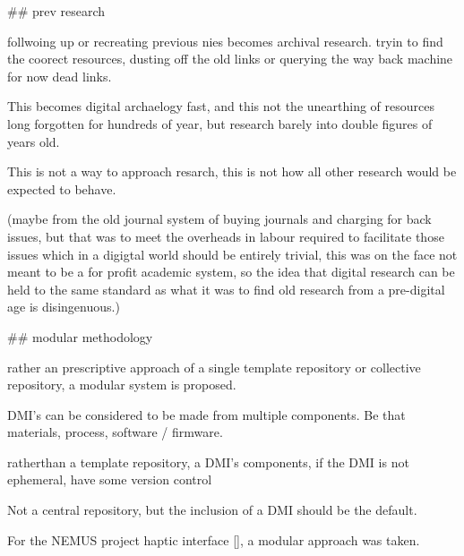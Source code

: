 




## prev research

follwoing up or recreating previous nies becomes archival research. tryin to find the coorect resources, dusting off the old links or querying the way back machine for now dead links.

This becomes digital archaelogy fast, and this not the unearthing of resources long forgotten for hundreds of year, but research barely into double figures of years old.

This is not a way to approach resarch, this is not how all other research would be expected to behave.

(maybe from the old journal system of buying journals and charging for back issues, but that was to meet the overheads in labour required to facilitate those issues which in a digigtal world should be entirely trivial, this was on the face not meant to be a for profit academic system, so the idea that digital research can be held to the same standard as what it was to find old research from a pre-digital age is disingenuous.)

## modular methodology

rather an prescriptive approach of a single template repository or collective repository, a modular system is proposed.

DMI's can be considered to be made from multiple components. Be that materials, process, software / firmware.

ratherthan a template repository, a DMI's components, if the DMI is not ephemeral, have some version control

Not a central repository, but the inclusion of a DMI should be the default.


For the NEMUS project haptic interface [], a modular approach was taken.

